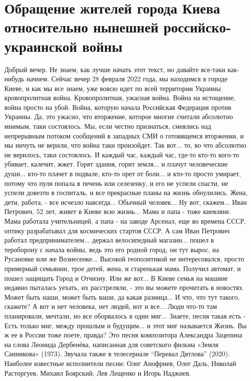  
 
 
 
 

\section{Обращение жителей города Киева относительно нынешней российско-украинской войны}

Добрый вечер. Не знаем, как лучше начать этот текст, но давайте все-таки
как-нибудь начнем. Сейчас вечер 28 февраля 2022 года, мы находимся в городе
Киеве, и как мы все знаем, уже вовсю идет по всей территории Украины
кровопролитная война. Кровопролитная, ужасная война. Война на истощение, война
просто на убой. Война, которую начала Российская Федерация против Украины. Да,
это ужасно, что вторжение, которое многие считали абсолютно мнимым, таки
состоялось. Мы, если честно признаться, смеялись над непрерывным потоком
сообщений в западных СМИ о готовящемся вторжении, и мы ничуть не верили, что
война таки произойдет. Так вот... то, во что абсолютно не верилось, таки
состоялось. И каждый час, каждый час, где-то кто-то кого-то убивает, калечит,
жжет. Горят здания, горит земля... и плачут человеческие души...  кто-то плачет
в подвале, кто-то орет от боли... и кто-то просто умирает, потому что пуля
попала в печень или селезенку, и его не успели спасти, не успели довезти в
госпиталь, и все прекрасные планы на жизнь обнулились. Жена, дети, работа, -
все исчезло навсегда... Обычный человек... Ну вот, скажем...  Иван Петрович, 52
лет, живет в Киеве всю жизнь... Мама и папа - тоже киевляне.  Мама работала
учительницей, а папа - на заводе Арсенал, еще во времена СССР, оптику
разрабатывал для космических стартов СССР.  А сам Иван Петрович работал
предпринимателем... держал велосипедный магазин... пошел в тероборону с начала
войны, ведь это его родной город, он тут вырос, на Русановке или же
Вознесенке... Высокой геополитикой не интересовался, просто примерный семьянин,
трое детей, жена, и старенькая мама.  Получил автомат, и пошел защищать Город и
Отчизну. Или же вот... В Киеве семья на машине недавно пыталась уехать, их
расстреляли, - это вы можете прочитать в новостях. Может быть наши, может быть
ваши, да какая разница... И что, что тут такого, скажете? А вот и нет человека,
нет людей, вот и все... Люди что-то там планировали, мечтали, но все оборвалось
в один миг...  Знаете, песня такая есть - Есть только миг, между прошлым и
будущим... и этот миг называется Жизнь. Вы ж ее в России тоже поете, правда?
Это песня композитора Александра Зацепина на слова Леонида Дербенёва,
написанная для советского фильма «Земля Санникова» (1973). Звучала также в
телесериале \enquote{Перевал Дятлова} (2020). Наиболее известные исполнители
песни: Олег Анофриев, Олег Даль, Николай Расторгуев, Михаил Боярский, Лев
Лещенко и Игорь Наджиев.

